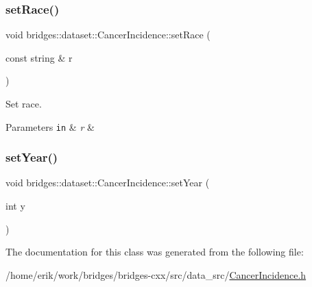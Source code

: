 \subsubsection{\texorpdfstring{set\+Race()}{setRace()}}
{\footnotesize\ttfamily void bridges\+::dataset\+::\+Cancer\+Incidence\+::set\+Race (\begin{DoxyParamCaption}\item[{const string \&}]{r }\end{DoxyParamCaption})\hspace{0.3cm}{\ttfamily [inline]}}



Set race. 


\begin{DoxyParams}[1]{Parameters}
\mbox{\tt in}  & {\em r} & \\
\hline
\end{DoxyParams}
\mbox{\label{classbridges_1_1dataset_1_1_cancer_incidence_a833ce8f785d61a5271a2ef949ed76680}} 
\subsubsection{\texorpdfstring{set\+Year()}{setYear()}}
{\footnotesize\ttfamily void bridges\+::dataset\+::\+Cancer\+Incidence\+::set\+Year (\begin{DoxyParamCaption}\item[{int}]{y }\end{DoxyParamCaption})\hspace{0.3cm}{\ttfamily [inline]}}



The documentation for this class was generated from the following file\+:\begin{DoxyCompactItemize}
\item 
/home/erik/work/bridges/bridges-\/cxx/src/data\+\_\+src/\hyperlink{_cancer_incidence_8h}{Cancer\+Incidence.\+h}\end{DoxyCompactItemize}
